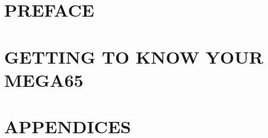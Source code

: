 \tableofcontents

\part{PREFACE}



\cleardoublepage
{}

\part{GETTING TO KNOW YOUR MEGA65}









%

%
%
%
%

\part{APPENDICES}

\begin{appendices}

  
  
  
  
\end{appendices}


\printindex

